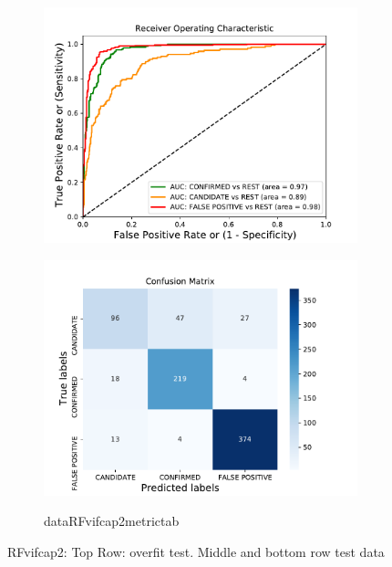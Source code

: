 \begin{figure}[H]
\begin{subfigure}{.49\textwidth}
                \includegraphics[width = 1\textwidth]{data/RF_vif_cap2_roc.pdf}
                \end{subfigure}
                \begin{subfigure}{.49\textwidth}
                \includegraphics[width = 1\textwidth]{data/RF_vif_cap2_cm.pdf}
                \end{subfigure}
                \begin{subfigure}{1\textwidth}
                \csname dataRFvifcap2metrictab\endcsname
                \end{subfigure}
                \caption{RFvifcap2: Top Row: overfit test. Middle and bottom row test data}
                \label{fig:data/RF_vif_cap2_roc}
                \end{figure}